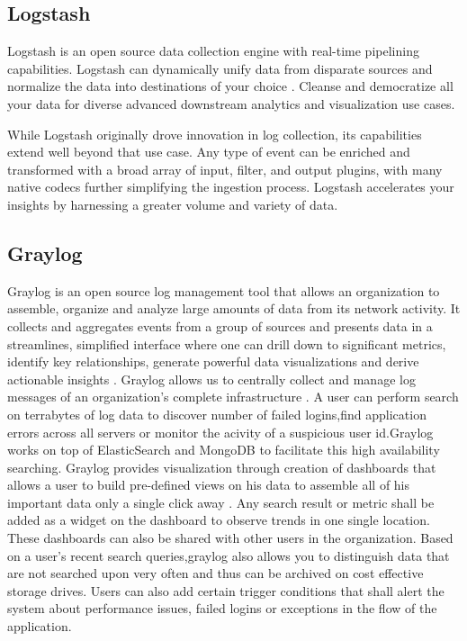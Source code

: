\subsection{Logstash}

    Logstash is an open source data collection engine with real-time
    pipelining capabilities. Logstash can dynamically unify data from
    disparate sources and normalize the data into destinations of your
    choice \cite{www-logstash}. Cleanse and democratize all your data
    for diverse advanced downstream analytics and visualization use
    cases.

    While Logstash originally drove innovation in log collection, its
    capabilities extend well beyond that use case. Any type of event
    can be enriched and transformed with a broad array of input,
    filter, and output plugins, with many native codecs further
    simplifying the ingestion process. Logstash accelerates your
    insights by harnessing a greater volume and variety of data.
	
\subsection{Graylog}

    Graylog is an open source log management tool that allows an
    organization to assemble, organize and analyze large amounts of
    data from its network activity. It collects and aggregates events
    from a group of sources and presents data in a streamlines,
    simplified interface where one can drill down to significant
    metrics, identify key relationships, generate powerful data
    visualizations and derive actionable insights
    \cite{www-graylog-blog}.  Graylog allows us to centrally collect
    and manage log messages of an organization's complete
    infrastructure \cite{www-graylog-optimization}. A user can
    perform search on terrabytes of log data to discover number of
    failed logins,find application errors across all servers or
    monitor the acivity of a suspicious user id.Graylog works on top
    of ElasticSearch and MongoDB to facilitate this high availability
    searching.  Graylog provides visualization through creation of
    dashboards that allows a user to build pre-defined views on his
    data to assemble all of his important data only a single click
    away \cite{www-graylog-dashboards}. Any search result or metric
    shall be added as a widget on the dashboard to observe trends in
    one single location. These dashboards can also be shared with
    other users in the organization. Based on a user's recent search
    queries,graylog also allows you to distinguish data that are not
    searched upon very often and thus can be archived on cost
    effective storage drives. Users can also add certain trigger
    conditions that shall alert the system about performance issues,
    failed logins or exceptions in the flow of the application.
    
